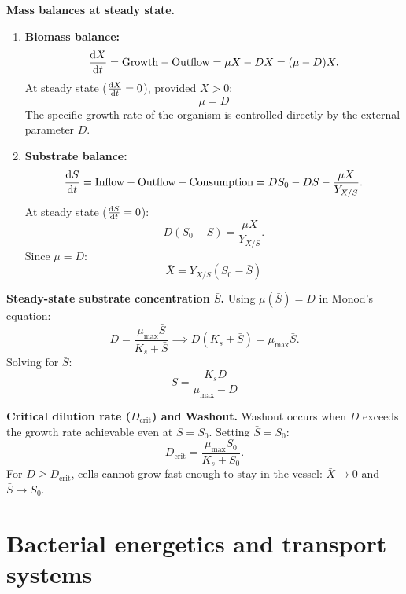 \documentclass[12pt, a4paper, oneside]{report}
\begin{document}
\textbf{Mass balances at steady state.}
\begin{enumerate}
  \item \textbf{Biomass balance:}
        \[
          \frac{\mathrm{d}X}{\mathrm{d}t} = \text{Growth} - \text{Outflow} = \mu X - D X = (\mu - D) X.
        \]
        At steady state ($\frac{\mathrm{d}X}{\mathrm{d}t} = 0$), provided $X > 0$:
        \begin{equation}
          \boxed{\mu = D}
          \label{eq:chemostat_mu}
        \end{equation}
        The specific growth rate of the organism is controlled directly by the external parameter $D$.

  \item \textbf{Substrate balance:}
        \[
          \frac{\mathrm{d}S}{\mathrm{d}t} = \text{Inflow} - \text{Outflow} - \text{Consumption} = D S_0 - D S - \frac{\mu X}{Y_{X/S}}.
        \]
        At steady state ($\frac{\mathrm{d}S}{\mathrm{d}t} = 0$):
        \[
          D(S_0 - S) = \frac{\mu X}{Y_{X/S}}.
        \]
        Since $\mu = D$:
        \begin{equation}
          \boxed{\bar{X} = Y_{X/S} (S_0 - \bar{S})}
          \label{eq:chemostat_X}
        \end{equation}
\end{enumerate}

\textbf{Steady-state substrate concentration $\bar{S}$.}
Using $\mu(\bar{S}) = D$ in Monod's equation:
\[
  D = \frac{\mu_{\max} \bar{S}}{K_s + \bar{S}} \implies D(K_s + \bar{S}) = \mu_{\max} \bar{S}.
\]
Solving for $\bar{S}$:
\begin{equation}
  \boxed{\bar{S} = \frac{K_s D}{\mu_{\max} - D}}
  \label{eq:chemostat_S}
\end{equation}

\textbf{Critical dilution rate ($D_{\text{crit}}$) and Washout.}
Washout occurs when $D$ exceeds the growth rate achievable even at $S = S_0$. Setting $\bar{S} = S_0$:
\begin{equation}
  D_{\text{crit}} = \frac{\mu_{\max} S_0}{K_s + S_0}.
  \label{eq:dcrit}
\end{equation}
For $D \geq D_{\text{crit}}$, cells cannot grow fast enough to stay in the vessel: $\bar{X} \to 0$ and $\bar{S} \to S_0$.

\section{Bacterial energetics and transport systems}
\end{document}
